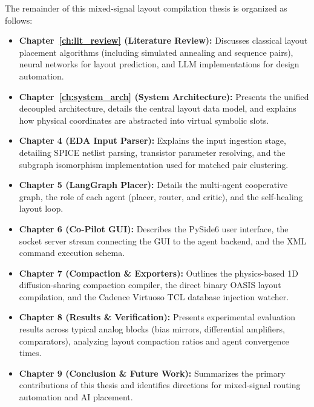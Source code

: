 The remainder of this mixed-signal layout compilation thesis is organized as follows:
\begin{itemize}
    \item \textbf{Chapter~\ref{ch:lit_review} (Literature Review):} Discusses classical layout placement algorithms (including simulated annealing and sequence pairs), neural networks for layout prediction, and LLM implementations for design automation.
    \item \textbf{Chapter~\ref{ch:system_arch} (System Architecture):} Presents the unified decoupled architecture, details the central layout data model, and explains how physical coordinates are abstracted into virtual symbolic slots.
    \item \textbf{Chapter 4 (EDA Input Parser):} Explains the input ingestion stage, detailing SPICE netlist parsing, transistor parameter resolving, and the subgraph isomorphism implementation used for matched pair clustering.
    \item \textbf{Chapter 5 (LangGraph Placer):} Details the multi-agent cooperative graph, the role of each agent (placer, router, and critic), and the self-healing layout loop.
    \item \textbf{Chapter 6 (Co-Pilot GUI):} Describes the PySide6 user interface, the socket server stream connecting the GUI to the agent backend, and the XML command execution schema.
    \item \textbf{Chapter 7 (Compaction \& Exporters):} Outlines the physics-based 1D diffusion-sharing compaction compiler, the direct binary OASIS layout compilation, and the Cadence Virtuoso TCL database injection watcher.
    \item \textbf{Chapter 8 (Results \& Verification):} Presents experimental evaluation results across typical analog blocks (bias mirrors, differential amplifiers, comparators), analyzing layout compaction ratios and agent convergence times.
    \item \textbf{Chapter 9 (Conclusion \& Future Work):} Summarizes the primary contributions of this thesis and identifies directions for mixed-signal routing automation and AI placement.
\end{itemize}
